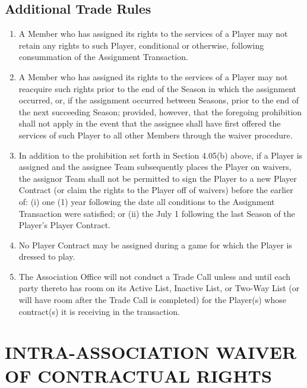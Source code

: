 \documentclass[]{book}
\providecommand{\tightlist}{%
  \setlength{\itemsep}{0pt}\setlength{\parskip}{0pt}}
\begin{document}
\hypertarget{additional-trade-rules}{%
\subsection{Additional Trade Rules}\label{additional-trade-rules}}

\begin{enumerate}
\def\labelenumi{(\alph{enumi})}
\tightlist
\item
  A Member who has assigned its rights to the services of a Player may not retain any rights to such Player, conditional or otherwise, following consummation of the Assignment Transaction.
\item
  A Member who has assigned its rights to the services of a Player may not reacquire such rights prior to the end of the Season in which the assignment occurred, or, if the assignment occurred between Seasons, prior to the end of the next succeeding Season; provided, however, that the foregoing prohibition shall not apply in the event that the assignee shall have first offered the services of such Player to all other Members through the waiver procedure.
\item
  In addition to the prohibition set forth in Section 4.05(b) above, if a Player is assigned and the assignee Team subsequently places the Player on waivers, the assignor Team shall not be permitted to sign the Player to a new Player Contract (or claim the rights to the Player off of waivers) before the earlier of: (i) one (1) year following the date all conditions to the Assignment Transaction were satisfied; or (ii) the July 1 following the last Season of the Player's Player Contract.
\item
  No Player Contract may be assigned during a game for which the Player is dressed to play.
\item
  The Association Office will not conduct a Trade Call unless and until each party thereto has room on its Active List, Inactive List, or Two-Way List (or will have room after the Trade Call is completed) for the Player(s) whose contract(s) it is receiving in the transaction.
\end{enumerate}

\hypertarget{intra-association-waiver-of-contractual-rights}{%
\section{INTRA-ASSOCIATION WAIVER OF CONTRACTUAL RIGHTS}\label{intra-association-waiver-of-contractual-rights}}
\end{document}
